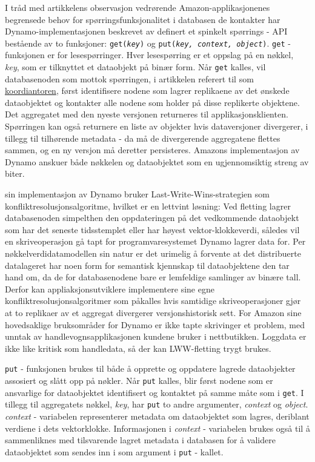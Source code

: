 I tråd med artikkelens observasjon vedrørende Amazon-applikasjonenes begrensede behov for spørringsfunksjonalitet i databasen de kontakter har Dynamo-implementasjonen beskrevet av \cite{decandia2007} definert et spinkelt spørrings - API bestående av to funksjoner: \texttt{get(\emph{key})} og \texttt{put(\emph{key, context, object})}. \texttt{get} - funksjonen er for lesespørringer. Hver lesespørring er et oppslag på en nøkkel, \emph{key}, som er tilknyttet et dataobjekt på binær form. Når \texttt{get} kalles, vil databasenoden som mottok spørringen, i artikkelen referert til som \underline{koordiantoren}, først identifisere nodene som lagrer replikaene av det ønskede dataobjektet og kontakter alle nodene som holder på disse replikerte objektene. Det aggregatet med den nyeste versjonen returneres til applikasjonsklienten. Spørringen kan også returnere en liste av objekter hvis dataversjoner divergerer, i tillegg til tilhørende metadata - da må de divergerende aggregatene flettes sammen, og en ny versjon må deretter persisteres. Amazons implementasjon av Dynamo anskuer både nøkkelen og dataobjektet som en ugjennomsiktig streng av biter.

\cite{decandia2007} sin implementasjon av Dynamo bruker Last-Write-Wins-strategien som konfliktresolusjonsalgoritme, hvilket er en lettvint løsning: Ved fletting lagrer databasenoden simpelthen den oppdateringen på det vedkommende dataobjekt som har det seneste tidsstemplet eller har høyest vektor-klokkeverdi, således vil en skriveoperasjon gå tapt for programvaresystemet Dynamo lagrer data for. Per nøkkelverdidatamodellen sin natur er det urimelig å forvente at det distribuerte datalageret har noen form for semantisk kjennskap til dataobjektene den tar hand om, da de for databasenodene bare er lemfeldige samlinger av binære tall. Derfor kan appliaksjonsutviklere implementere sine egne konfliktresolusjonsalgoritmer som påkalles hvis samtidige skriveoperasjoner gjør at to replikaer av et aggregat divergerer versjonshistorisk sett. For Amazon sine hovedsaklige bruksområder for Dynamo er ikke tapte skrivinger et problem, med unntak av handlevognsapplikasjonen kundene bruker i nettbutikken. Loggdata er ikke like kritisk som handledata, så der kan LWW-fletting trygt brukes.

\texttt{put} - funksjonen brukes til både å opprette og oppdatere lagrede dataobjekter assosiert og slått opp på nøkler. Når \texttt{put} kalles, blir først nodene som er ansvarlige for dataobjektet identifisert og kontaktet på samme måte som i \texttt{get}. I tillegg til aggregatets nøkkel, \emph{key}, har \texttt{put} to andre argumenter, \emph{context} og \emph{object}. \emph{context} - variabelen representerer metadata om dataobjektet som lagres, deriblant verdiene i dets vektorklokke. Informasjonen i \emph{context} - variabelen brukes også til å sammenliknes med tilsvarende lagret metadata i databasen for å validere dataobjektet som sendes inn i som argument i \texttt{put} - kallet.

